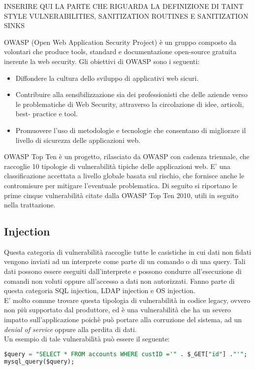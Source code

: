INSERIRE QUI LA PARTE CHE RIGUARDA LA DEFINIZIONE DI TAINT STYLE VULNERABILITIES, SANITIZATION ROUTINES E SANITIZATION SINKS

OWASP (Open Web Application Security Project) è un gruppo composto da volontari che produce tools, standard e documentazione open-source gratuita inerente la web security. 
Gli obiettivi di OWASP sono i seguenti:
\begin{itemize}
\item Diffondere la cultura dello sviluppo di applicativi web sicuri.
\item Contribuire alla sensibilizzazione sia dei professionisti che delle aziende verso le problematiche di Web Security, attraverso la circolazione di idee, articoli, best- practice e tool.
\item Promuovere l’uso di metodologie e tecnologie che consentano di migliorare il livello di sicurezza delle applicazioni web.
\end{itemize}
OWASP Top Ten è un progetto, rilasciato da OWASP con cadenza triennale, che raccoglie 10 tipologie di vulnerabilità tipiche delle applicazioni web. E' una classificazione accettata a livello globale basata sul rischio, che fornisce anche le contromisure per mitigare l'eventuale problematica. Di seguito si riportano le prime cinque vulnerabilità citate dalla OWASP Top Ten 2010, utili in seguito nella trattazione.

\subsection{Injection}
Questa categoria di vulnerabilità raccoglie tutte le casistiche in cui dati non fidati vengono inviati ad un interprete come parte di un comando o di una query. Tali dati possono essere eseguiti dall'interprete e possono condurre all'esecuzione di comandi non voluti oppure all'accesso a dati non autorizzati. Fanno parte di questa categoria SQL injection, LDAP injection e OS injection.\\
E' molto comune trovare questa tipologia di vulnerabilità in codice legacy, ovvero non più supportato dal produttore, ed è una vulnerabilità che ha un severo impatto sull'applicazione poichè può portare alla corruzione del sistema, ad un \emph{denial of service} oppure alla perdita di dati.\\
Un esempio di tale vulnerabilità può essere il seguente:
\begin{lstlisting}[language=SQL]
$query = "SELECT * FROM accounts WHERE custID ='" . $_GET["id"] ."'";
mysql_query($query);
\end{lstlisting}

